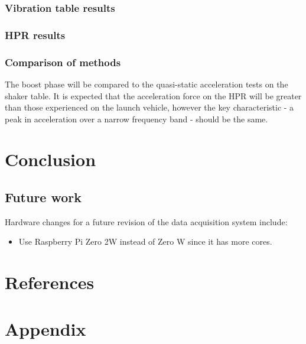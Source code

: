 \documentclass[a4paper,11pt]{article}
\begin{document}
\subsubsection{Vibration table results}
\subsubsection{HPR results}
\subsubsection{Comparison of methods}
The boost phase will be compared to the quasi-static acceleration tests on the shaker table. It is expected that the acceleration force on the HPR will be greater than those experienced on the launch vehicle, however the key characteristic - a peak in acceleration over a narrow frequency band - should be the same.

\section{Conclusion}
\subsection{Future work}

Hardware changes for a future revision of the data acquisition system include:

\begin{itemize}
  \item Use Raspberry Pi Zero 2W instead of Zero W since it has more cores.
\end{itemize}

\section{References}

\printbibliography[heading=none]

\section{Appendix}
\end{document}
